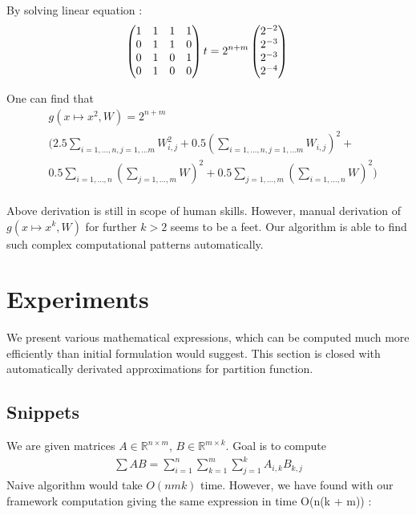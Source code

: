 \documentclass{article}
\begin{document}
 By solving linear equation :
 \begin{equation}
 \begin{pmatrix} 
  1 & 1 & 1 & 1 \\ 
  0 & 1 & 1 & 0 \\ 
  0 & 1 & 0 & 1 \\ 
  0 & 1 & 0 & 0 \\     
\end{pmatrix}t = 2^{n + m}\begin{pmatrix} 
  2^{-2}\\ 
  2^{-3}\\ 
  2^{-3}\\ 
  2^{-4}\\     
\end{pmatrix} \\
 \end{equation}

One can find that 
\begin{align*}
	&g(x \mapsto x^2, W) = 2^{n + m} \\ 
 &\Big( 2.5\sum_{i = 1, \dots, n, j = 1, \dots m} W_{i, j}^2 + 0.5(\sum_{i = 1, \dots, n, j = 1, \dots m} W_{i, j})^2 + \\
 &0.5\sum_{i = 1, \dots, n}(\sum_{j = 1, \dots, m} W)^2 + 0.5\sum_{j = 1, \dots, m}(\sum_{i = 1, \dots, n} W)^2 \Big)\\
\end{align*}

Above derivation is still in scope of human skills. However, manual derivation
of $g(x \mapsto x^k, W)$ for further $k > 2$  seems to be a feet. Our algorithm
is able to find such complex computational patterns automatically.

\section{Experiments}

We present various mathematical expressions, which can be computed much more efficiently
than initial formulation would suggest. This section is closed with automatically derivated
approximations for partition function. 

\subsection{Snippets}

We are given matrices $A \in \mathbb{R}^{n \times m}$, $B \in \mathbb{R}^{m \times k}$. 
Goal is to compute 
\begin{align*}
	\sum AB = \sum_{i = 1}^n \sum_{k = 1}^m \sum_{j = 1}^k A_{i, k} B_{k, j} 
\end{align*}
Naive algorithm would take $O(nmk)$ time. However, we have found with our framework 
computation giving the same expression in time O(n(k + m)) :
\end{document}

